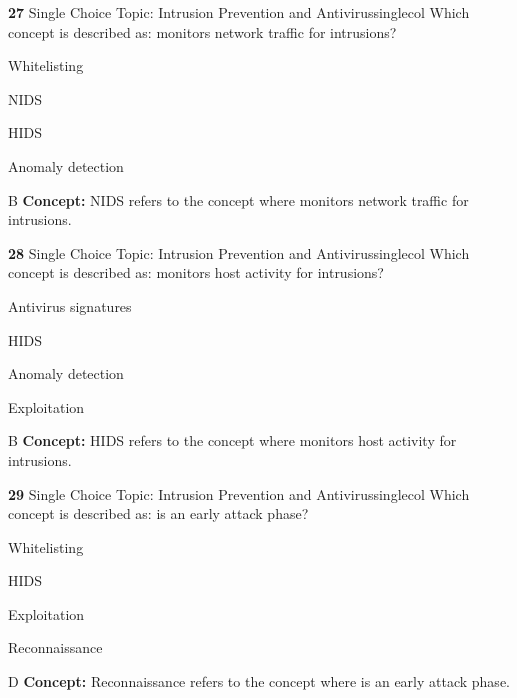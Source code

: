 \documentclass[10pt,a4paper]{article}
\begin{document}
\begin{qcard}{\color{white}\textbf{27} \hfill \small Single Choice \textbar{} Topic: Intrusion Prevention and Antivirus}{singlecol}
Which concept is described as: monitors network traffic for intrusions?

\begin{qoptions}
\item Whitelisting
\item NIDS
\item HIDS
\item Anomaly detection
\end{qoptions}
\begin{explainbox}{B}
\textbf{Concept:} NIDS refers to the concept where monitors network traffic for intrusions.
\end{explainbox}
\end{qcard}

\begin{qcard}{\color{white}\textbf{28} \hfill \small Single Choice \textbar{} Topic: Intrusion Prevention and Antivirus}{singlecol}
Which concept is described as: monitors host activity for intrusions?

\begin{qoptions}
\item Antivirus signatures
\item HIDS
\item Anomaly detection
\item Exploitation
\end{qoptions}
\begin{explainbox}{B}
\textbf{Concept:} HIDS refers to the concept where monitors host activity for intrusions.
\end{explainbox}
\end{qcard}

\begin{qcard}{\color{white}\textbf{29} \hfill \small Single Choice \textbar{} Topic: Intrusion Prevention and Antivirus}{singlecol}
Which concept is described as: is an early attack phase?

\begin{qoptions}
\item Whitelisting
\item HIDS
\item Exploitation
\item Reconnaissance
\end{qoptions}
\begin{explainbox}{D}
\textbf{Concept:} Reconnaissance refers to the concept where is an early attack phase.
\end{explainbox}
\end{qcard}
\end{document}
